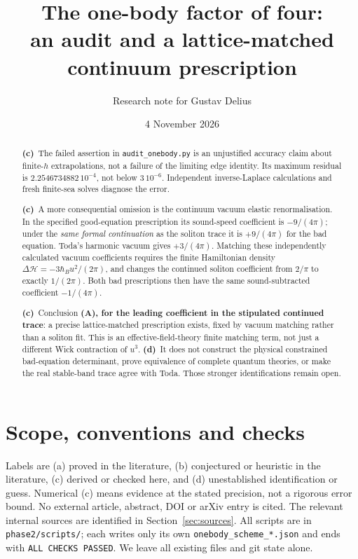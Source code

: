 \documentclass[11pt,a4paper]{article}
\title{The one-body factor of four:\\an audit and a lattice-matched continuum prescription}
\author{Research note for Gustav Delius}
\date{4 November 2026}
\newcommand{\Lc}{\textbf{(c)}\ }
\newcommand{\Ld}{\textbf{(d)}\ }
\begin{document}
\maketitle

\begin{abstract}
\Lc The failed assertion in \texttt{audit\_onebody.py} is an unjustified
accuracy claim about finite-$h$ extrapolations, not a failure of the limiting
edge identity. Its maximum residual is $2.2546734882\,10^{-4}$, not below
$3\,10^{-6}$. Independent inverse-Laplace calculations and fresh finite-sea
solves diagnose the error.

\Lc A more consequential omission is the continuum vacuum elastic
renormalisation. In the specified good-equation prescription its sound-speed
coefficient is $-9/(4\pi)$; under the \emph{same formal continuation} as the
soliton trace it is $+9/(4\pi)$ for the bad equation. Toda's harmonic vacuum
gives $+3/(4\pi)$. Matching these independently calculated vacuum coefficients
requires the finite Hamiltonian density
$\Delta\mathcal H=-3\hbar_B u^2/(2\pi)$, and changes the continued soliton
coefficient from $2/\pi$ to exactly $1/(2\pi)$. Both bad prescriptions then
have the same sound-subtracted coefficient $-1/(4\pi)$.

\Lc Conclusion \textbf{(A), for the leading coefficient in the stipulated
continued trace}: a precise lattice-matched prescription exists, fixed by
vacuum matching rather than a soliton fit. This is an effective-field-theory
finite matching term, not just a different Wick contraction of $u^3$.
\Ld It does not construct the physical constrained bad-equation determinant,
prove equivalence of complete quantum theories, or make the real stable-band
trace agree with Toda. Those stronger identifications remain open.
\end{abstract}

\section{Scope, conventions and checks}
Labels are (a) proved in the literature, (b) conjectured or heuristic in the
literature, (c) derived or checked here, and (d) unestablished identification
or guess. Numerical (c) means evidence at the stated precision, not a rigorous
error bound. No external article, abstract, DOI or arXiv entry is cited.
The relevant internal sources are identified in Section~\ref{sec:sources}.
All scripts are in \texttt{phase2/scripts/}; each writes only its own
\texttt{onebody\_scheme\_*.json} and ends with
\texttt{ALL CHECKS PASSED}. We leave all existing files and git state alone.
\end{document}
